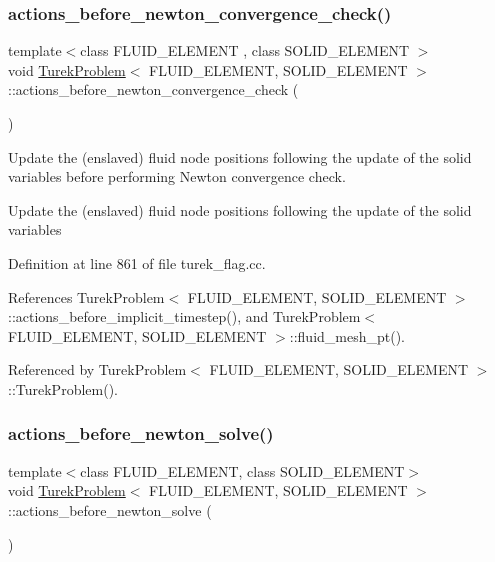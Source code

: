 \subsubsection{\texorpdfstring{actions\+\_\+before\+\_\+newton\+\_\+convergence\+\_\+check()}{actions\_before\_newton\_convergence\_check()}}
{\footnotesize\ttfamily template$<$class F\+L\+U\+I\+D\+\_\+\+E\+L\+E\+M\+E\+NT , class S\+O\+L\+I\+D\+\_\+\+E\+L\+E\+M\+E\+NT $>$ \\
void \hyperlink{classTurekProblem}{Turek\+Problem}$<$ F\+L\+U\+I\+D\+\_\+\+E\+L\+E\+M\+E\+NT, S\+O\+L\+I\+D\+\_\+\+E\+L\+E\+M\+E\+NT $>$\+::actions\+\_\+before\+\_\+newton\+\_\+convergence\+\_\+check (\begin{DoxyParamCaption}{ }\end{DoxyParamCaption})}



Update the (enslaved) fluid node positions following the update of the solid variables before performing Newton convergence check. 

Update the (enslaved) fluid node positions following the update of the solid variables 

Definition at line 861 of file turek\+\_\+flag.\+cc.



References Turek\+Problem$<$ F\+L\+U\+I\+D\+\_\+\+E\+L\+E\+M\+E\+N\+T, S\+O\+L\+I\+D\+\_\+\+E\+L\+E\+M\+E\+N\+T $>$\+::actions\+\_\+before\+\_\+implicit\+\_\+timestep(), and Turek\+Problem$<$ F\+L\+U\+I\+D\+\_\+\+E\+L\+E\+M\+E\+N\+T, S\+O\+L\+I\+D\+\_\+\+E\+L\+E\+M\+E\+N\+T $>$\+::fluid\+\_\+mesh\+\_\+pt().



Referenced by Turek\+Problem$<$ F\+L\+U\+I\+D\+\_\+\+E\+L\+E\+M\+E\+N\+T, S\+O\+L\+I\+D\+\_\+\+E\+L\+E\+M\+E\+N\+T $>$\+::\+Turek\+Problem().

\mbox{\label{classTurekProblem_a889518fdaf0c4215e21981afbfc669bd}} 
\subsubsection{\texorpdfstring{actions\+\_\+before\+\_\+newton\+\_\+solve()}{actions\_before\_newton\_solve()}}
{\footnotesize\ttfamily template$<$class F\+L\+U\+I\+D\+\_\+\+E\+L\+E\+M\+E\+NT, class S\+O\+L\+I\+D\+\_\+\+E\+L\+E\+M\+E\+NT$>$ \\
void \hyperlink{classTurekProblem}{Turek\+Problem}$<$ F\+L\+U\+I\+D\+\_\+\+E\+L\+E\+M\+E\+NT, S\+O\+L\+I\+D\+\_\+\+E\+L\+E\+M\+E\+NT $>$\+::actions\+\_\+before\+\_\+newton\+\_\+solve (\begin{DoxyParamCaption}{ }\end{DoxyParamCaption})\hspace{0.3cm}{\ttfamily [inline]}}



